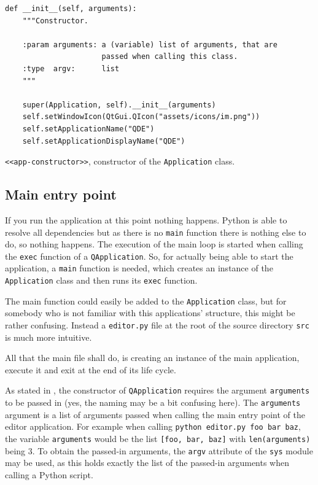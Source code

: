 \documentclass[10pt, openright, notitlepage]{scrreprt}
\begin{document}
\begin{listing}[H]
\begin{verbatim}
def __init__(self, arguments):
    """Constructor.

    :param arguments: a (variable) list of arguments, that are
                      passed when calling this class.
    :type  argv:      list
    """

    super(Application, self).__init__(arguments)
    self.setWindowIcon(QtGui.QIcon("assets/icons/im.png"))
    self.setApplicationName("QDE")
    self.setApplicationDisplayName("QDE")
\end{verbatim}
\caption{\label{app-constructor}
\texttt{<<app-constructor>>}, constructor of the \texttt{Application} class.}
\end{listing}

\subsection{Main entry point}
\label{sec:orgda48793}

If you run the application at this point nothing happens. Python is able to
resolve all dependencies but as there is no \texttt{main} function there is nothing
else to do, so nothing happens. The execution of the main loop is started when
calling the \texttt{exec} function of a \texttt{QApplication}. So, for actually being able to
start the application, a \texttt{main} function is needed, which creates an instance of
the \texttt{Application} class and then runs its \texttt{exec} function.

The main function could easily be added to the \texttt{Application} class, but for
somebody who is not familiar with this applications' structure, this might be
rather confusing. Instead a \texttt{editor.py} file at the root of the source directory
\texttt{src} is much more intuitive.

All that the main file shall do, is creating an instance of the main
application, execute it and exit at the end of its life cycle.

As stated in \label{Imports}, the constructor of \texttt{QApplication} requires the
argument \texttt{arguments} to be passed in (yes, the naming may be a bit confusing
here). The \texttt{arguments} argument is a list of arguments passed when calling the
main entry point of the editor application. For example when calling \texttt{python editor.py foo bar baz},
the variable \texttt{arguments} would be the list \texttt{[foo, bar, baz]} with
\texttt{len(arguments)} being 3. To obtain the passed-in arguments, the \texttt{argv}
attribute of the \texttt{sys} module may be used, as this holds exactly the list of the
passed-in arguments when calling a Python script.
\end{document}
